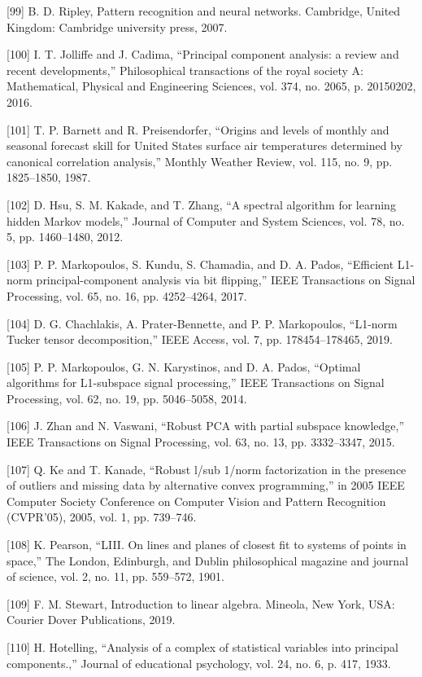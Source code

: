 \documentclass[sn-mathphys-num]{sn-jnl}%
\begin{document}
[99] B. D. Ripley, Pattern recognition and neural networks. Cambridge, United Kingdom: Cambridge university press, 2007.

[100] I. T. Jolliffe and J. Cadima, “Principal component analysis: a review and recent developments,” Philosophical transactions of the royal society A: Mathematical, Physical and Engineering Sciences, vol. 374, no. 2065, p. 20150202, 2016.

[101] T. P. Barnett and R. Preisendorfer, “Origins and levels of monthly and seasonal forecast skill for United States surface air temperatures determined by canonical correlation analysis,” Monthly Weather Review, vol. 115, no. 9, pp. 1825–1850, 1987.

[102] D. Hsu, S. M. Kakade, and T. Zhang, “A spectral algorithm for learning hidden Markov models,” Journal of Computer and System Sciences, vol. 78, no. 5, pp. 1460–1480, 2012.

[103] P. P. Markopoulos, S. Kundu, S. Chamadia, and D. A. Pados, “Efficient L1-norm principal-component analysis via bit flipping,” IEEE Transactions on Signal Processing, vol. 65, no. 16, pp. 4252–4264, 2017.

[104] D. G. Chachlakis, A. Prater-Bennette, and P. P. Markopoulos, “L1-norm Tucker tensor decomposition,” IEEE Access, vol. 7, pp. 178454–178465, 2019.

[105] P. P. Markopoulos, G. N. Karystinos, and D. A. Pados, “Optimal algorithms for L1-subspace signal processing,” IEEE Transactions on Signal Processing, vol. 62, no. 19, pp. 5046–5058, 2014.

[106] J. Zhan and N. Vaswani, “Robust PCA with partial subspace knowledge,” IEEE Transactions on Signal Processing, vol. 63, no. 13, pp. 3332–3347, 2015.

[107] Q. Ke and T. Kanade, “Robust l/sub 1/norm factorization in the presence of outliers and missing data by alternative convex programming,” in 2005 IEEE Computer Society Conference on Computer Vision and Pattern Recognition (CVPR’05), 2005, vol. 1, pp. 739–746.

[108] K. Pearson, “LIII. On lines and planes of closest fit to systems of points in space,” The London, Edinburgh, and Dublin philosophical magazine and journal of science, vol. 2, no. 11, pp. 559–572, 1901.

[109] F. M. Stewart, Introduction to linear algebra. Mineola, New York, USA: Courier Dover Publications, 2019.

[110] H. Hotelling, “Analysis of a complex of statistical variables into principal components.,” Journal of educational psychology, vol. 24, no. 6, p. 417, 1933.
\end{document}
